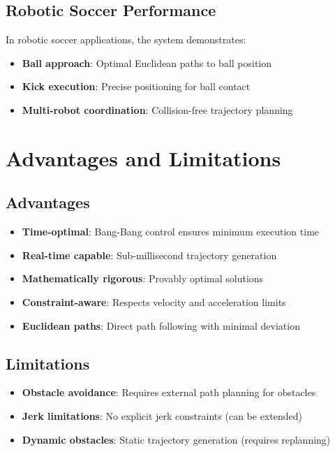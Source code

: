 \documentclass[12pt,a4paper]{article}
\begin{document}
\subsection{Robotic Soccer Performance}

In robotic soccer applications, the system demonstrates:

\begin{itemize}
\item \textbf{Ball approach}: Optimal Euclidean paths to ball position
\item \textbf{Kick execution}: Precise positioning for ball contact
\item \textbf{Multi-robot coordination}: Collision-free trajectory planning
\end{itemize}

\section{Advantages and Limitations}

\subsection{Advantages}

\begin{itemize}
\item \textbf{Time-optimal}: Bang-Bang control ensures minimum execution time
\item \textbf{Real-time capable}: Sub-millisecond trajectory generation
\item \textbf{Mathematically rigorous}: Provably optimal solutions
\item \textbf{Constraint-aware}: Respects velocity and acceleration limits
\item \textbf{Euclidean paths}: Direct path following with minimal deviation
\end{itemize}

\subsection{Limitations}

\begin{itemize}
\item \textbf{Obstacle avoidance}: Requires external path planning for obstacles
\item \textbf{Jerk limitations}: No explicit jerk constraints (can be extended)
\item \textbf{Dynamic obstacles}: Static trajectory generation (requires replanning)
\end{itemize}
\end{document}
